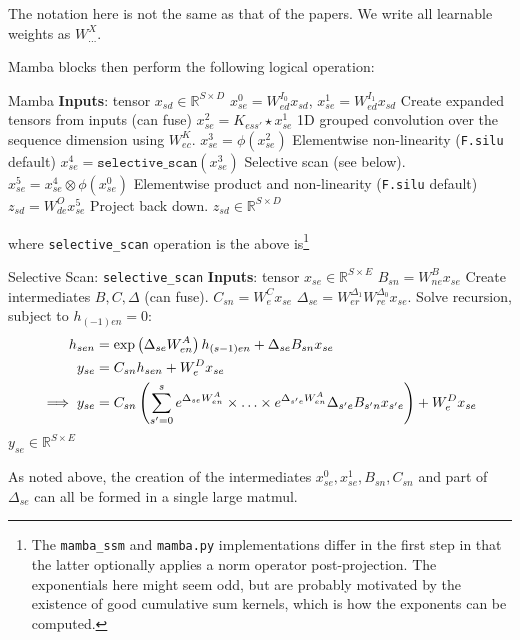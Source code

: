 The notation here is not the same as that of the papers. We write all learnable weights as $ W ^{ X }_{ \ldots  } $.


Mamba blocks then perform the following logical operation:
\begin{algo}{Mamba}
\State \textbf{Inputs}: tensor $ x _{ sd }\in \mathbb{R}^{ S\times D } $
\State $ x ^{ 0 } _{ se } = W ^{ I _{ 0 } }_{ ed } x _{ sd }$, $ x ^{ 1 }  _{ se } = W ^{ I _{ 1 } }_{ ed } x _{ sd } $ \Comment Create expanded tensors from inputs (can fuse)
\State $ x ^{ 2 } _{ se } = K _{ ess' }\star x ^{ 1 }_{ se }$ \Comment 1D grouped convolution over the sequence dimension using $ W ^{ K }_{ ec } $.
\State $ x ^{ 3 } _{ se } = \phi \left ( x ^{ 2 }_{ se } \right )$ \Comment Elementwise non-linearity (\texttt{F.silu} default)
\State $ x ^{ 4 } _{ se } = \texttt{selective\_scan} \left ( x ^{ 3 }_{ se } \right )$ \Comment Selective scan (see below).
\State $ x ^{ 5 } _{ se } = x ^{ 4 } _{ se }\otimes\phi \left ( x ^{ 0 }_{ se } \right )$ \Comment Elementwise product and non-linearity (\texttt{F.silu} default)
\State $ z _{ sd } = W ^{ O }_{ de }x ^{ 5 }_{ se }$ \Comment Project back down.
\State \Return $ z _{ sd } \in \mathbb{R}^{ S\times D }$
\label{algo_mamba_1}
\end{algo}

where \texttt{selective\_scan} operation is the above is\footnote{The \texttt{mamba\_ssm} and
\texttt{mamba.py} implementations differ in the first step in that the latter optionally applies a
norm operator post-projection. The exponentials here might seem odd, but are probably motivated by
the existence of good cumulative sum kernels, which is how the exponents can be computed.}

\begin{algo}{Selective Scan: \texttt{selective\_scan} }
\State \textbf{Inputs}: tensor $ x _{ se }\in \mathbb{R}^{ S\times E } $
\State $ B _{ sn } = W ^{ B }_{ ne }x _{ se } $  \Comment Create intermediates $B, C, \Delta  $ (can
fuse).
\State $ C _{ sn } = W ^{ C }_{ e }x _{ se } $
\State $ \Delta  _{ se } = W ^{ \Delta  _{ 1 } }_{ er } W ^{ \Delta _{ 0 } } _{ re } x _{ se } $.
\State Solve recursion, subject to $ h _{ (-1)en }=0 $:
\begin{align}
    h _{ sen } &= \exp \left ( \Delta  _{ se } W^{A} _{ en } \right ) h _{ (s-1)e n} + \Delta _{ se }B _{ sn }x _{ se }\nonumber\\
    y _{ se } &= C _{ sn }h _{ sen } + W ^{ D } _{ e }x _{ se } \nonumber\\
    \implies y _{ se } &= C _{ sn }\left (\sum _{ s'=0 }^{ s }e^{ \Delta _{ se }W^{A} _{ en } }\times \ldots \times e^{ \Delta _{ s'e }W^{A} _{ en } } \Delta _{ s'e } B _{ s'n } x _{ s'e }\right ) + W ^{ D } _{ e } x _{ se }
\end{align}
\State \Return $ y _{ se } \in \mathbb{R}^{ S\times E }$
\label{algo_mamba1_scan}
\end{algo}
As noted above, the creation of the intermediates $ x ^{ 0 }_{ se }, x ^{ 1 }_{ se }, B _{ sn }, C
_{ sn } $ and part of $ \Delta  _{ se } $ can all be formed in a single large matmul.

